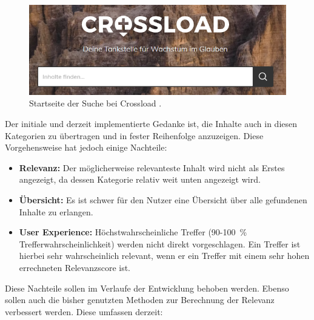 \begin{figure}[h]
  \begin{centering}
    \includegraphics[width=\textwidth]{figures/foundations/crossloadSucheStart.png}
    \caption{Startseite der Suche bei Crossload \cite{pfleiderer2022}.}
    \label{fig:crossloadSucheStart}
  \end{centering}
\end{figure}

Der initiale und derzeit implementierte Gedanke ist, die Inhalte auch in diesen Kategorien zu übertragen und in fester Reihenfolge anzuzeigen.
Diese Vorgehensweise hat jedoch einige Nachteile:

\begin{itemize}
  \item \textbf{Relevanz:} Der möglicherweise relevanteste Inhalt wird nicht als Erstes angezeigt, da dessen Kategorie relativ weit unten angezeigt wird.
  \item \textbf{Übersicht:} Es ist schwer für den Nutzer eine Übersicht über alle gefundenen Inhalte zu erlangen.
  \item \textbf{User Experience:} Höchstwahrscheinliche Treffer (90-100 \% Trefferwahrscheinlichkeit) werden nicht direkt vorgeschlagen.
  Ein Treffer ist hierbei sehr wahrscheinlich relevant, wenn er ein Treffer mit einem sehr hohen errechneten Relevanzscore ist.
\end{itemize}

Diese Nachteile sollen im Verlaufe der Entwicklung behoben werden.
Ebenso sollen auch die bisher genutzten Methoden zur Berechnung der Relevanz verbessert werden.
Diese umfassen derzeit:

